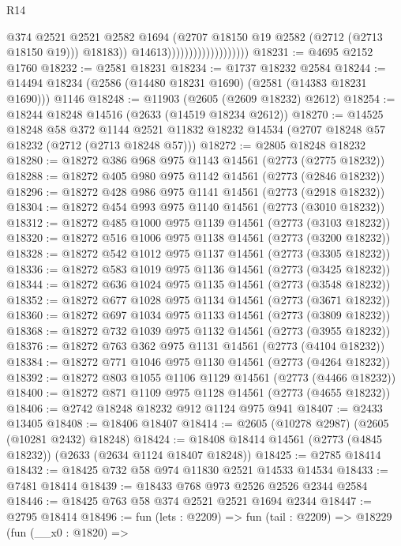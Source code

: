 \begin{lexlean}{R14}
\begin{coremodule}
                                              @374
                                              @2521
                                              @2521
                                              @2582
                                              @1694
                                              (@2707 @18150 @19 @2582 (@2712 (@2713 @18150 @19)))
                                              @18183))
                                          @14613)))))))))))))))))))
@18231 := @4695 @2152 @1760
@18232 := @2581 @18231
@18234 := @1737 @18232 @2584
@18244 := @14494 @18234 (@2586 (@14480 @18231 @1690) (@2581 (@14383 @18231 @1690))) @1146
@18248 := @11903 (@2605 (@2609 @18232) @2612)
@18254 := @18244 @18248 @14516 (@2633 (@14519 @18234 @2612))
@18270 := @14525
    @18248
    @58
    @372
    @1144
    @2521
    @11832
    @18232
    @14534
    (@2707 @18248 @57 @18232 (@2712 (@2713 @18248 @57)))
@18272 := @2805 @18248 @18232
@18280 := @18272 @386 @968 @975 @1143 @14561 (@2773 (@2775 @18232))
@18288 := @18272 @405 @980 @975 @1142 @14561 (@2773 (@2846 @18232))
@18296 := @18272 @428 @986 @975 @1141 @14561 (@2773 (@2918 @18232))
@18304 := @18272 @454 @993 @975 @1140 @14561 (@2773 (@3010 @18232))
@18312 := @18272 @485 @1000 @975 @1139 @14561 (@2773 (@3103 @18232))
@18320 := @18272 @516 @1006 @975 @1138 @14561 (@2773 (@3200 @18232))
@18328 := @18272 @542 @1012 @975 @1137 @14561 (@2773 (@3305 @18232))
@18336 := @18272 @583 @1019 @975 @1136 @14561 (@2773 (@3425 @18232))
@18344 := @18272 @636 @1024 @975 @1135 @14561 (@2773 (@3548 @18232))
@18352 := @18272 @677 @1028 @975 @1134 @14561 (@2773 (@3671 @18232))
@18360 := @18272 @697 @1034 @975 @1133 @14561 (@2773 (@3809 @18232))
@18368 := @18272 @732 @1039 @975 @1132 @14561 (@2773 (@3955 @18232))
@18376 := @18272 @763 @362 @975 @1131 @14561 (@2773 (@4104 @18232))
@18384 := @18272 @771 @1046 @975 @1130 @14561 (@2773 (@4264 @18232))
@18392 := @18272 @803 @1055 @1106 @1129 @14561 (@2773 (@4466 @18232))
@18400 := @18272 @871 @1109 @975 @1128 @14561 (@2773 (@4655 @18232))
@18406 := @2742 @18248 @18232 @912 @1124 @975 @941
@18407 := @2433 @13405
@18408 := @18406 @18407
@18414 := @2605 (@10278 @2987) (@2605 (@10281 @2432) @18248)
@18424 := @18408 @18414 @14561 (@2773 (@4845 @18232)) (@2633 (@2634 @1124 @18407 @18248))
@18425 := @2785 @18414
@18432 := @18425 @732 @58 @974 @11830 @2521 @14533 @14534
@18433 := @7481 @18414
@18439 := @18433 @768 @973 @2526 @2526 @2344 @2584
@18446 := @18425 @763 @58 @374 @2521 @2521 @1694 @2344
@18447 := @2795 @18414
@18496 := fun (lets : @2209) =>
  fun (tail : @2209) =>
  @18229
    (fun (__x0 : @1820) =>

\end{coremodule}
\end{lexlean}

